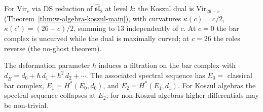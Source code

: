 \begin{computation}
\label{comp:dq-koszul-vir}
For $\mathrm{Vir}_c$ via DS reduction of $\widehat{\mathfrak{sl}}_2$ at level $k$: the Koszul dual is $\mathrm{Vir}_{26-c}$ (Theorem~\ref{thm:w-algebra-koszul-main}), with curvatures $\kappa(c)=c/2$, $\kappa(c')=(26-c)/2$, summing to $13$ independently of $c$.  At $c=0$ the bar complex is uncurved while the dual is maximally curved; at $c=26$ the roles reverse (the no-ghost theorem).
\end{computation}

\begin{remark}
\label{rem:filtered-dq}
The deformation parameter $\hbar$ induces a filtration on the bar complex with $d_{\bar{B}} = d_0 + \hbar\, d_1 + \hbar^2\, d_2 + \cdots$.  The associated spectral sequence has $E_0 =$ classical bar complex, $E_1 = H^*(E_0, d_0)$, and $E_2 = H^*(E_1, d_1)$.  For Koszul algebras the spectral sequence collapses at $E_2$; for non-Koszul algebras higher differentials may be non-trivial.
\end{remark}
